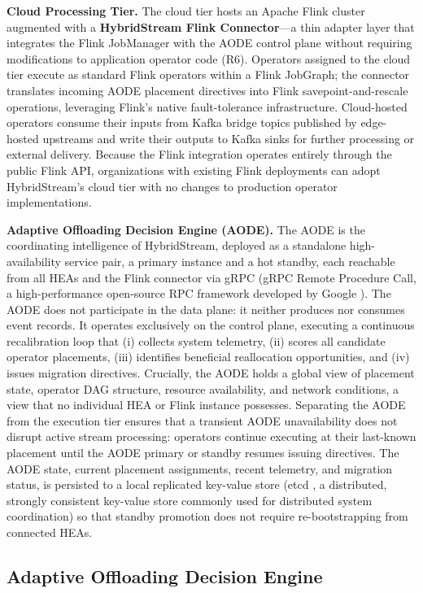 \documentclass[preprint,review,12pt]{elsarticle}
\begin{document}
\textbf{Cloud Processing Tier.} The cloud tier hosts an Apache Flink cluster augmented with a \textbf{HybridStream Flink Connector}—a thin adapter layer that integrates the Flink JobManager with the AODE control plane without requiring modifications to application operator code (R6). Operators assigned to the cloud tier execute as standard Flink operators within a Flink JobGraph; the connector translates incoming AODE placement directives into Flink savepoint-and-rescale operations, leveraging Flink's native fault-tolerance infrastructure. Cloud-hosted operators consume their inputs from Kafka bridge topics published by edge-hosted upstreams and write their outputs to Kafka sinks for further processing or external delivery. Because the Flink integration operates entirely through the public Flink API, organizations with existing Flink deployments can adopt HybridStream's cloud tier with no changes to production operator implementations.

\textbf{Adaptive Offloading Decision Engine (AODE).} The AODE is the coordinating intelligence of HybridStream, deployed as a standalone high-availability service pair, a primary instance and a hot standby, each reachable from all HEAs and the Flink connector via gRPC (gRPC Remote Procedure Call, a high-performance open-source RPC framework developed by Google \cite{grpc2023}). The AODE does not participate in the data plane: it neither produces nor consumes event records. It operates exclusively on the control plane, executing a continuous recalibration loop that (i) collects system telemetry, (ii) scores all candidate operator placements, (iii) identifies beneficial reallocation opportunities, and (iv) issues migration directives. Crucially, the AODE holds a global view of placement state, operator DAG structure, resource availability, and network conditions, a view that no individual HEA or Flink instance possesses. Separating the AODE from the execution tier ensures that a transient AODE unavailability does not disrupt active stream processing: operators continue executing at their last-known placement until the AODE primary or standby resumes issuing directives. The AODE state, current placement assignments, recent telemetry, and migration status, is persisted to a local replicated key-value store (etcd \cite{etcd2023}, a distributed, strongly consistent key-value store commonly used for distributed system coordination) so that standby promotion does not require re-bootstrapping from connected HEAs.

\subsection{Adaptive Offloading Decision Engine}\label{adaptive-offloading-decision-engine}
\end{document}
